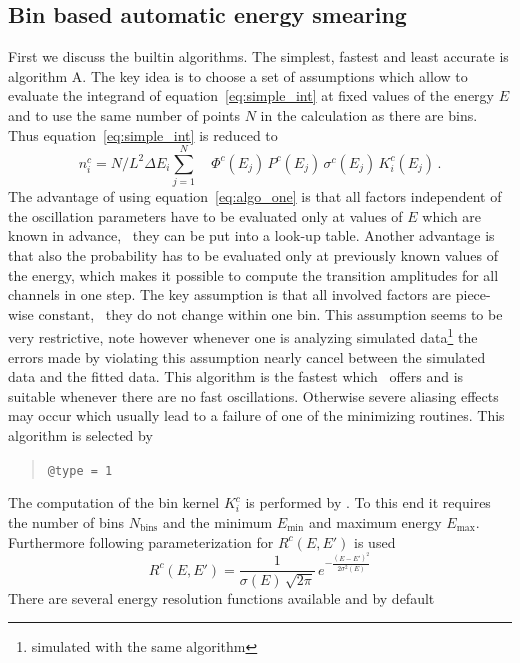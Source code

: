 
\subsection{Bin based automatic energy smearing}

First we discuss the builtin algorithms. The simplest, fastest and
least accurate is algorithm A. The key idea is to choose a set of assumptions
which allow to evaluate the integrand of equation~\ref{eq:simple_int}
at fixed values of the energy $E$ and to use the same number of points $N$ in
the calculation as there are bins. Thus equation~\ref{eq:simple_int} is reduced
to
\begin{equation}
\label{eq:algo_one}
n_i^c=N/L^2 \Delta E_i \sum_{j=1}^N \quad  \Phi^c(E_j)\,
P^c(E_j)\,
\sigma^c(E_j)\,
K_i^c(E_j)\,.
\end{equation}
The advantage of using equation~\ref{eq:algo_one} is that all factors
independent of the oscillation parameters have to be evaluated only at 
values of $E$ which are known in advance, \ie\ they can be put 
into a look-up table. Another advantage is that also the probability
has to be evaluated only at previously known values of the energy, which
makes it possible to compute the transition amplitudes for all channels
in one step. The key assumption is that all involved factors are piece-wise
constant, \ie\ they do not change within one bin. This assumption seems to be
very restrictive, note however whenever one is analyzing simulated 
data\footnote{simulated with the same algorithm} the errors
made by violating this assumption nearly cancel between the simulated 
data and the fitted data. This algorithm is the fastest which \GLOBES\ offers
and is suitable whenever there are no fast oscillations. Otherwise severe
aliasing effects may occur which usually lead to a failure of one of the 
minimizing routines. This algorithm is selected by
\begin{quote}
{\tt \tb @type = 1}
\end{quote}
The computation of the bin kernel $K_i^c$ is performed
by \GLOBES. To this end it requires  the number of bins
 $N_\mathrm{bins}$
and the minimum $E_\mathrm{min}$ and maximum energy $E_\mathrm{max}$. 
Furthermore following parameterization
for $R^c(E,E')$ is used
\begin{equation}
R^c(E,E')=\frac{1}{\sigma(E)\,\sqrt{2\pi}}\,e^{-\frac{(E-E')^2}{2\sigma^2(E)}}
\end{equation} 
There are several energy resolution functions available and by default
